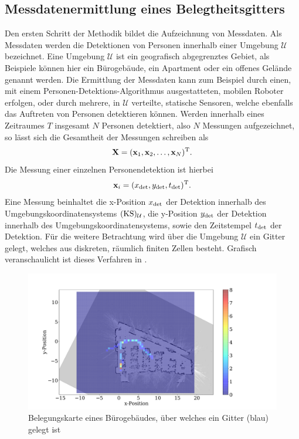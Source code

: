 \subsection{Messdatenermittlung eines Belegtheitsgitters}
\label{sec.Messdatenermittlung eines Belegtheitsgitters binär}
Den ersten Schritt der Methodik bildet die Aufzeichnung von Messdaten. Als Messdaten werden die Detektionen von Personen innerhalb einer Umgebung $\mathcal{U}$ bezeichnet. Eine Umgebung $\mathcal{U}$ ist ein geografisch abgegrenztes Gebiet, als Beispiele können hier ein Bürogebäude, ein Apartment oder ein offenes Gelände genannt werden. Die Ermittlung der Messdaten kann zum Beispiel durch einen, mit einem Personen-Detektions-Algorithmus ausgestatteten, mobilen Roboter erfolgen, oder durch mehrere, in $\mathcal{U}$ verteilte, statische Sensoren, welche ebenfalls das Auftreten von Personen detektieren können. Werden innerhalb eines Zeitraumes $T$ insgesamt $N$ Personen detektiert, also $N$ Messungen aufgezeichnet, so lässt sich die Gesamtheit der Messungen schreiben als
\begin{equation}
	\mathbf{X} = (\mathbf{x}_1, \mathbf{x}_2, \dots , \mathbf{x}_N)^{\mathrm{T}} .
	\label{eq:Gesamtheit Messungen}
\end{equation}
Die Messung einer einzelnen Personendetektion ist hierbei
\begin{equation}
	\mathbf{x}_i = (x_{\mathrm{det}}, y_{\mathrm{det}}, t_{\mathrm{det}})^{\mathrm{T}} .
	\label{eq:Einzelmessung_x}
\end{equation}
Eine Messung beinhaltet  die x-Position  $x_{\mathrm{det}}$ der Detektion innerhalb des Umgebungskoordinatensystems $(\textrm{KS})_{\mathrm{\mathcal{U}}}$, die y-Position $y_{\mathrm{det}}$ der Detektion innerhalb des Umgebungskoordinatensystems, sowie den Zeitstempel $t_{\mathrm{det}}$ der Detektion.
Für die weitere Betrachtung wird über die Umgebung $\mathcal{U}$ ein Gitter gelegt, welches aus diskreten, räumlich finiten Zellen besteht. Grafisch veranschaulicht ist dieses Verfahren in .

\begin{figure}[!h]
	\begin{center}
		\includegraphics[width=\linewidth]{Abbildungen/methodik/Occupancy_grid_anschaulich}
		\caption[Belegungskarte grafische Darstellung]{Belegungskarte eines Bürogebäudes, über welches ein Gitter (blau) gelegt ist}
		\label{fig.Bürogebäude_Gitter}
	\end{center}
\end{figure}


